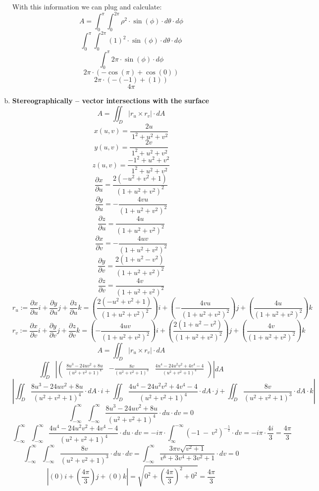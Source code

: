 \documentclass{article}
\begin{document}
\begin{enumerate}[a.]
          With this information we can plug and calculate:
          \[ A =\int_{0}^{\pi}\int_{0}^{2\pi} \rho^2\cdot\sin(\phi)\cdot d\theta\cdot d\phi  \]
          \[ \int_{0}^{\pi}\int_{0}^{2\pi} (1)^2\cdot\sin(\phi)\cdot d\theta\cdot d\phi\]
          \[ \int_{0}^{\pi}2\pi \cdot \sin(\phi)\cdot d\phi \]
          \[ 2\pi \cdot (-\cos(\pi) + \cos(0)) \]
          \[ 2\pi \cdot (-(-1)+(1)) \]
          \[ 4\pi\]

    \item \textbf{Stereographically -- vector intersections with the surface}
          \[ A = \iint_{D} |r_u \times r_v| \cdot dA \]
          \[x(u,v)=\frac{2u}{\:1^2+u^2+v^2}\]
          \[y(u,v)=\frac{2v}{\:1^2+u^2+v^2}\]
          \[z(u,v)=\frac{-1^2+u^2+v^2}{\:1^2+u^2+v^2}\]
          \[\frac{\partial x}{\partial u} = \frac{2\left(-u^2+v^2+1\right)}{\left(1+u^2+v^2\right)^2}\]
          \[\frac{\partial y}{\partial u} = -\frac{4vu}{\left(1+u^2+v^2\right)^2}\]
          \[\frac{\partial z}{\partial u} = \frac{4u}{\left(1+u^2+v^2\right)^2}\]
          \[\frac{\partial x}{\partial v} = -\frac{4uv}{\left(1+u^2+v^2\right)^2}\]
          \[\frac{\partial y}{\partial v} = \frac{2\left(1+u^2-v^2\right)}{\left(1+u^2+v^2\right)^2}\]
          \[\frac{\partial z}{\partial v} = \frac{4v}{\left(1+u^2+v^2\right)^2}\]
          \[r_u := \frac{\partial x}{\partial u}i + \frac{\partial y}{\partial u}j + \frac{\partial z}{\partial u}k = \left(\frac{2\left(-u^2+v^2+1\right)}{\left(1+u^2+v^2\right)^2}\right)i + \left(-\frac{4vu}{\left(1+u^2+v^2\right)^2}\right)j + \left(\frac{4u}{\left(1+u^2+v^2\right)^2}\right)k\]
          \[r_v := \frac{\partial x}{\partial v}i + \frac{\partial y}{\partial v}j + \frac{\partial z}{\partial v}k = \left(-\frac{4uv}{\left(1+u^2+v^2\right)^2}\right)i + \left(\frac{2\left(1+u^2-v^2\right)}{\left(1+u^2+v^2\right)^2}\right)j + \left(\frac{4v}{\left(1+u^2+v^2\right)^2}\right)k\]
          \[ A = \iint_{D} |r_u \times r_v| \cdot dA \]
          \[\iint_{D} \left|\begin{pmatrix}\frac{8u^3-24uv^2+8u}{\left(u^2+v^2+1\right)^4}&-\frac{8v}{\left(u^2+v^2+1\right)^3}&\frac{4u^4-24u^2v^2+4v^4-4}{\left(u^2+v^2+1\right)^4}\end{pmatrix}\right| dA\]
          \[\left|\iint_{D} \frac{8u^3-24uv^2+8u}{\left(u^2+v^2+1\right)^4} \cdot dA \cdot i + \iint_{D}\frac{4u^4-24u^2v^2+4v^4-4}{\left(u^2+v^2+1\right)^4} \cdot dA \cdot j + \iint_{D}\frac{8v}{\left(u^2+v^2+1\right)^3}\cdot dA \cdot k \right|\]
          \[\int_{-\infty}^{\infty}\int_{-\infty}^{\infty} \frac{8u^3-24uv^2+8u}{\left(u^2+v^2+1\right)^4} \cdot du \cdot dv = 0\]
          \[\int_{-\infty}^{\infty}\int_{-\infty}^{\infty}\frac{4u^4-24u^2v^2+4v^4-4}{\left(u^2+v^2+1\right)^4} \cdot  du \cdot dv = -i\pi\cdot\int_{\infty}^{-\infty}\left(-1\:-\:v^2\right)^{-\frac{5}{2}}\cdot dv = -i\pi \cdot \frac{4i}{3} = \frac{4\pi}{3}\]
          \[\int_{-\infty}^{\infty}\int_{-\infty}^{\infty}\frac{8v}{\left(u^2+v^2+1\right)^3} \cdot  du \cdot dv = \int_{-\infty}^{\infty}\frac{3\pi v\sqrt{v^2+1}}{v^6+3v^4+3v^2+1} \cdot dv = 0\]
          \[\left|(0)i + \left(\frac{4\pi}{3}\right)j+(0)k\right|=\sqrt{0^2+\left(\frac{4\pi }{3}\right)^2+0^2}=\frac{4\pi}{3}\]

\end{enumerate}
\end{document}
